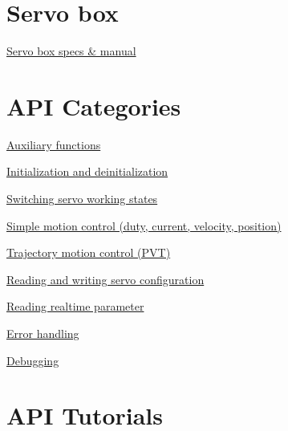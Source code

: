 \hypertarget{index_sbox}{}\section{Servo box}\label{index_sbox}

\begin{DoxyItemize}
\item \hyperlink{group__hw__manual}{Servo box specs \& manual}
\end{DoxyItemize}\hypertarget{index_intro_section}{}\section{A\+P\+I Categories}\label{index_intro_section}

\begin{DoxyItemize}
\item \hyperlink{group___aux}{Auxiliary functions}
\item \hyperlink{group___init}{Initialization and deinitialization}
\item \hyperlink{group___state}{Switching servo working states}
\item \hyperlink{group___motion}{Simple motion control (duty, current, velocity, position)}
\item \hyperlink{group___trajectory}{Trajectory motion control (P\+VT)}
\item \hyperlink{group___config}{Reading and writing servo configuration}
\item \hyperlink{group___realtime}{Reading realtime parameter}
\item \hyperlink{group___err}{Error handling}
\item \hyperlink{group___dbg}{Debugging}
\end{DoxyItemize}\hypertarget{index_tutor}{}\section{A\+P\+I Tutorials}\label{index_tutor}


